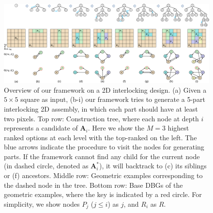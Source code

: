 \begin{figure}[!t]
	\centering
	\includegraphics[width=17.80cm]{images/Framework_Overview.png}
	\vspace*{-2.5mm}
	\caption{		
		Overview of our framework on a 2D interlocking design.
		(a) Given a $5 \times 5$ square as input, (b-i) our framework tries to generate a 5-part interlocking 2D assembly, in which each part should have at least two pixels.
		Top row: Construction tree, where each node at depth $i$ represents a candidate of $\mathbf{A}_i$.
		Here we show the $M=3$ highest ranked options at each level with the top-ranked on the left.
		The blue arrows indicate the procedure to visit the nodes for generating parts. 
		If the framework cannot find any child for the current node (in dashed circle, denoted as $\mathbf{A}_i^*$), it will backtrack to (c) its siblings or (f) ancestors.
		Middle row: Geometric examples corresponding to the dashed node in the tree.
		Bottom row: Base DBGs of the geometric examples, where the key is indicated by a red circle. For simplicity, we show nodes $P_j$ ($j\leq i$)  as $j$, and $R_i$ as $R$.
	\vspace*{-3.0mm}
	\label{fig:Framework_Overview}}
\end{figure}


